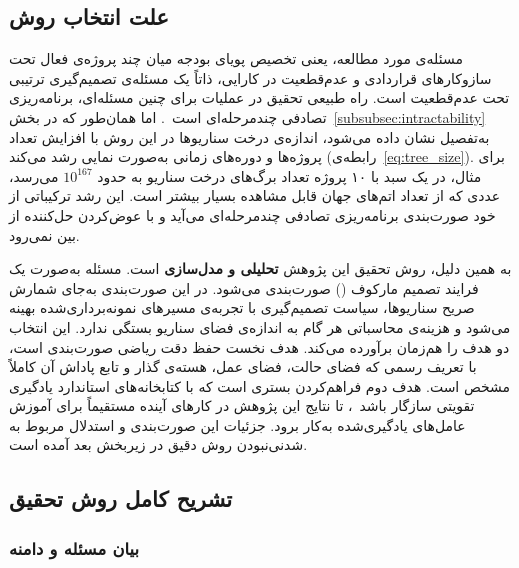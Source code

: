 \subsection{علت انتخاب روش}

مسئله‌ی مورد مطالعه، یعنی تخصیص پویای بودجه میان چند پروژه‌ی فعال تحت
سازوکارهای قراردادی  و عدم‌قطعیت در کارایی، ذاتاً یک مسئله‌ی
تصمیم‌گیری ترتیبی تحت عدم‌قطعیت است. راه طبیعی تحقیق در عملیات برای
چنین مسئله‌ای، برنامه‌ریزی تصادفی چندمرحله‌ای است~\citep{Birge2011}.
اما همان‌طور که در بخش~\ref{subsubsec:intractability} به‌تفصیل نشان
داده می‌شود، اندازه‌ی درخت سناریوها در این روش با افزایش تعداد پروژه‌ها
و دوره‌های زمانی به‌صورت نمایی رشد می‌کند (رابطه‌ی~\eqref{eq:tree_size}).
برای مثال، در یک سبد با ۱۰ پروژه تعداد برگ‌های درخت سناریو به حدود
$10^{167}$ می‌رسد، عددی که از تعداد اتم‌های جهان قابل مشاهده بسیار بیشتر
است. این رشد ترکیباتی از خود صورت‌بندی برنامه‌ریزی تصادفی چندمرحله‌ای
می‌آید و با عوض‌کردن حل‌کننده از بین نمی‌رود.

به همین دلیل، روش تحقیق این پژوهش \textbf{تحلیلی و مدل‌سازی} است. مسئله
به‌صورت یک فرایند تصمیم مارکوف () صورت‌بندی می‌شود. در این
صورت‌بندی به‌جای شمارش صریح سناریوها، سیاست تصمیم‌گیری با تجربه‌ی
مسیرهای نمونه‌برداری‌شده بهینه می‌شود و هزینه‌ی محاسباتی هر گام به
اندازه‌ی فضای سناریو بستگی ندارد. این انتخاب دو هدف را هم‌زمان برآورده
می‌کند. هدف نخست حفظ دقت ریاضی صورت‌بندی است، با تعریف رسمی  که
فضای حالت، فضای عمل، هسته‌ی گذار و تابع پاداش آن کاملاً مشخص است. هدف
دوم فراهم‌کردن بستری است که با کتابخانه‌های استاندارد یادگیری تقویتی
سازگار باشد~\citep{Towers2024}، تا نتایج این پژوهش در کارهای آینده
مستقیماً برای آموزش عامل‌های یادگیری‌شده به‌کار برود. جزئیات این
صورت‌بندی و استدلال مربوط به شدنی‌نبودن روش دقیق در زیربخش بعد آمده است.

\subsection{تشریح کامل روش تحقیق}

\subsubsection{بیان مسئله و دامنه}
\label{subsec:problem_statement}

